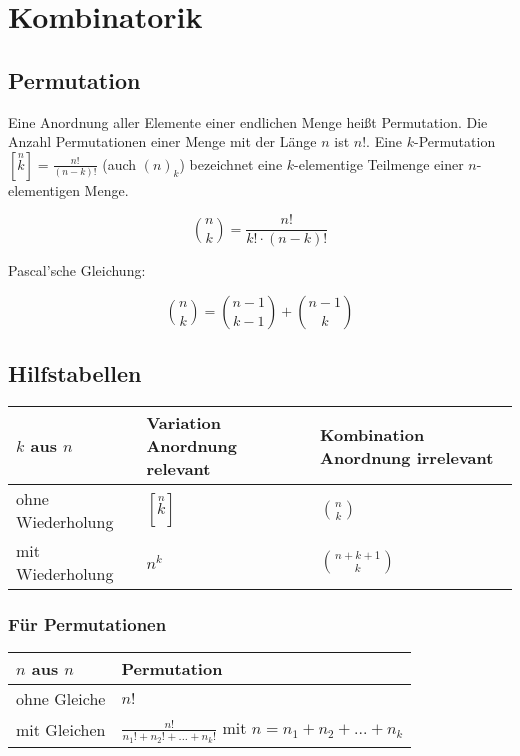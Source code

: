 \documentclass[10pt,a4paper,twoside,twocolumn]{article}
\begin{document}
	\section{Kombinatorik}
	
	\subsection{Permutation}
	
	Eine Anordnung aller Elemente einer endlichen Menge heißt Permutation. Die Anzahl Permutationen einer Menge mit der Länge $ n $ ist $ n! $. Eine $ k $-Permutation $ [\stackrel{n}{k}] = \frac{n!}{(n - k)!} $ (auch $ (n)_k $) bezeichnet eine $ k $-elementige Teilmenge einer $ n $-elementigen Menge. 
	
	\[ \binom{n}{k} = \frac{n!}{k! \cdot (n - k)!} \]
	
	Pascal'sche Gleichung:
	
	\[ \binom{n}{k} = \binom{n - 1}{k - 1} + \binom{n - 1}{k} \]
	
	\subsection{Hilfstabellen}
	
	\begin{tabularx}{\columnwidth}{XXX}
		\hline 
		$ k $ aus $ n $ & Variation \newline Anordnung relevant & Kombination \newline Anordnung irrelevant \\ 
		\hline 
		ohne \newline Wiederholung & $ [\stackrel{n}{k}] $ & $ \binom{n}{k} $ \\ 
		\hline 
		mit \newline Wiederholung & $ n^k $ & $ \binom{n+ k + 1}{k} $ \\ 
		\hline 
	\end{tabularx}

	\subsubsection{Für Permutationen}
	
	\begin{tabularx}{\columnwidth}{XX}
		\hline 
		$ n $ aus $ n $ & Permutation \\ 
		\hline 
		ohne Gleiche & $ n! $ \\ 
		\hline 
		mit Gleichen & $ \frac{n!}{n_1! + n_2! + ... + n_k!} $ \newline mit $ n = n_1 + n_2 + ... + n_k $ \\ 
		\hline 
	\end{tabularx}
\end{document}

